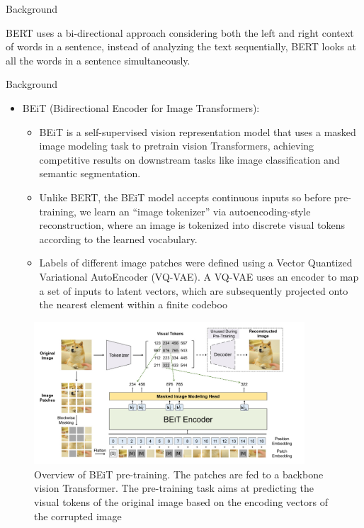 \documentclass[10pt]{beamer}
\begin{document}
\begin{frame}{Background}
\begin{itemize}
            BERT uses a bi-directional approach considering both the left and
            right context of words in a sentence, instead of analyzing the text
            sequentially, BERT looks at all the words in a sentence
            simultaneously.

    \end{itemize}
\end{frame}

\begin{frame}{Background}
    \begin{itemize}
        \item BEiT (Bidirectional Encoder for Image Transformers):

            \begin{itemize}
            \item BEiT is a self-supervised vision representation model that uses a
            masked image modeling task to pretrain vision Transformers,
            achieving competitive results on downstream tasks like image
            classification and semantic segmentation.

            \item Unlike BERT, the BEiT model accepts continuous inputs so before pre-training,
            we learn an “image tokenizer” via autoencoding-style reconstruction, where an image is tokenized into
            discrete visual tokens according to the learned vocabulary.

        \item Labels of different image patches were defined using a Vector
            Quantized Variational AutoEncoder (VQ-VAE).
            A VQ-VAE uses an encoder to map a set of inputs to
            latent vectors, which are subsequently projected onto the
            nearest element within a finite codeboo
            \end{itemize}

    \end{itemize}
\end{frame}

\begin{frame}
    \begin{figure}
        \includegraphics[width=0.9\textwidth]{beit.jpeg}
        \caption{Overview of BEiT pre-training. The patches are fed to a backbone vision
        Transformer. The pre-training task aims at predicting the visual tokens
    of the original image based
on the encoding vectors of the corrupted image}
\end{figure}
\end{frame}
\end{document}
